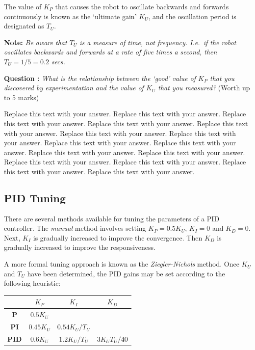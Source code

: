 \documentclass[hidelinks,a4paper,11pt]{article}
\newcounter{question}
\newcommand\myq{\refstepcounter{question}\thequestion}
\begin{document}
The value of $K_P$ that causes the robot to oscillate backwards and forwards continuously is known as the `ultimate gain' $K_U$, and the oscillation period is designated as $T_U$.

{\bfseries Note:}  \emph{Be aware that $T_U$ is a measure of time, not frequency.  I.e.\ if the robot oscillates backwards and forwards at a rate of five times a second, then $T_U=1/5=0.2$ secs.}

{\bfseries Question \myq:}  \emph{What is the relationship between the `good' value of $K_P$ that you discovered by experimentation and the value of $K_U$ that you measured?} (Worth up to 5 marks)\\
\begin{mdframed}
Replace this text with your answer.  Replace this text with your answer.  Replace this text with your answer.  Replace this text with your answer.  Replace this text with your answer.  Replace this text with your answer.  Replace this text with your answer.  Replace this text with your answer.  Replace this text with your answer.  Replace this text with your answer.  Replace this text with your answer.  Replace this text with your answer.  Replace this text with your answer.  Replace this text with your answer.  Replace this text with your answer.
\end{mdframed}
\vspace*{\baselineskip}


\subsection {PID Tuning}

There are several methods available for tuning the parameters of a PID controller.  The \emph{manual} method involves setting $K_P=0.5K_U$, $K_I=0$ and $K_D=0$.  Next, $K_I$ is gradually increased to improve the convergence.  Then $K_D$ is gradually increased to improve the responsiveness.

A more formal tuning approach is known as the \emph{Ziegler-Nichols} method.  Once $K_U$ and $T_U$ have been determined, the PID gains may be set according to the following heuristic:
\begin{center}
	\begin{tabular}{ | c | c | c | c | } \hline
		 & \bf{$K_P$} & \bf{$K_I$} & \bf{$K_D$} \\ \hline
		\bf{P} & $0.5K_U$ &  &  \\ \hline
		\bf{PI} & $0.45K_U$ & $0.54K_U/T_U$ &  \\ \hline
		\bf{PID} & $0.6K_U$ & $1.2K_U/T_U$ & $3K_UT_U/40$ \\ \hline
	\end{tabular}
\end{center}
\vspace*{\baselineskip}
\end{document}
